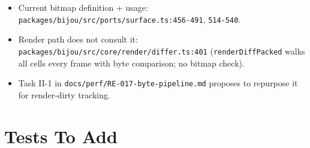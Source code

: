 \begin{itemize}
\tightlist
\item
  Current bitmap definition + usage: \texttt{p\allowbreak{}a\allowbreak{}c\allowbreak{}k\allowbreak{}a\allowbreak{}g\allowbreak{}e\allowbreak{}s\allowbreak{}/\allowbreak{}b\allowbreak{}i\allowbreak{}j\allowbreak{}o\allowbreak{}u\allowbreak{}/\allowbreak{}s\allowbreak{}r\allowbreak{}c\allowbreak{}/\allowbreak{}p\allowbreak{}o\allowbreak{}r\allowbreak{}t\allowbreak{}s\allowbreak{}/\allowbreak{}s\allowbreak{}u\allowbreak{}r\allowbreak{}f\allowbreak{}a\allowbreak{}c\allowbreak{}e\allowbreak{}.\allowbreak{}t\allowbreak{}s\allowbreak{}:\allowbreak{}4\allowbreak{}5\allowbreak{}6\allowbreak{}-\allowbreak{}4\allowbreak{}9\allowbreak{}1}, \texttt{5\allowbreak{}1\allowbreak{}4\allowbreak{}-\allowbreak{}5\allowbreak{}4\allowbreak{}0}.
\item
  Render path does not consult it: \texttt{p\allowbreak{}a\allowbreak{}c\allowbreak{}k\allowbreak{}a\allowbreak{}g\allowbreak{}e\allowbreak{}s\allowbreak{}/\allowbreak{}b\allowbreak{}i\allowbreak{}j\allowbreak{}o\allowbreak{}u\allowbreak{}/\allowbreak{}s\allowbreak{}r\allowbreak{}c\allowbreak{}/\allowbreak{}c\allowbreak{}o\allowbreak{}r\allowbreak{}e\allowbreak{}/\allowbreak{}r\allowbreak{}e\allowbreak{}n\allowbreak{}d\allowbreak{}e\allowbreak{}r\allowbreak{}/\allowbreak{}d\allowbreak{}i\allowbreak{}f\allowbreak{}f\allowbreak{}e\allowbreak{}r\allowbreak{}.\allowbreak{}t\allowbreak{}s\allowbreak{}:\allowbreak{}4\allowbreak{}0\allowbreak{}1} (\texttt{r\allowbreak{}e\allowbreak{}n\allowbreak{}d\allowbreak{}e\allowbreak{}r\allowbreak{}D\allowbreak{}i\allowbreak{}f\allowbreak{}f\allowbreak{}P\allowbreak{}a\allowbreak{}c\allowbreak{}k\allowbreak{}e\allowbreak{}d} walks all cells every frame with byte comparison; no bitmap check).
\item
  Task II-1 in \texttt{d\allowbreak{}o\allowbreak{}c\allowbreak{}s\allowbreak{}/\allowbreak{}p\allowbreak{}e\allowbreak{}r\allowbreak{}f\allowbreak{}/\allowbreak{}R\allowbreak{}E\allowbreak{}-\allowbreak{}0\allowbreak{}1\allowbreak{}7\allowbreak{}-\allowbreak{}b\allowbreak{}y\allowbreak{}t\allowbreak{}e\allowbreak{}-\allowbreak{}p\allowbreak{}i\allowbreak{}p\allowbreak{}e\allowbreak{}l\allowbreak{}i\allowbreak{}n\allowbreak{}e\allowbreak{}.\allowbreak{}m\allowbreak{}d} proposes to repurpose it for render-dirty tracking.
\end{itemize}

\section{Tests To Add}\label{record-368-tests-to-add}

